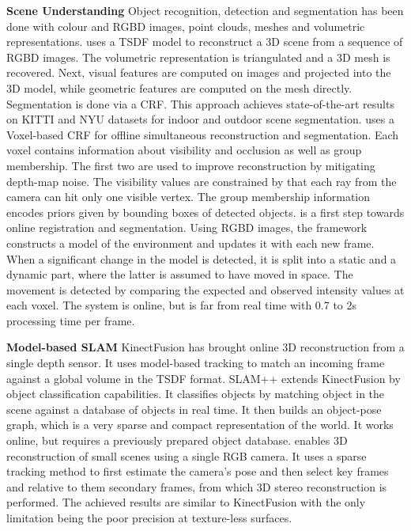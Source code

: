 \documentclass{llncs}
\begin{document}
  \textbf{Scene Understanding } Object recognition, detection and segmentation has been done with colour and RGBD images, point clouds, meshes and volumetric representations. \cite{mesh}  uses a TSDF model to reconstruct a 3D scene from a sequence of RGBD images. The volumetric representation is triangulated and a 3D mesh is recovered. Next, visual features are computed on images and projected into the 3D model, while geometric features are computed on the mesh directly. Segmentation is done via a CRF. This approach achieves state-of-the-art results on KITTI and NYU datasets for indoor and outdoor scene segmentation. \cite{VCRF} uses a Voxel-based CRF for offline simultaneous reconstruction and segmentation. Each voxel contains information about visibility and occlusion as well as group membership. The first two are used to improve reconstruction by mitigating depth-map noise. The visibility values are constrained by that each ray from the camera can hit only one visible vertex. The group membership information encodes priors given by bounding boxes of detected objects. \cite{ChangeDetection} is a first step towards online registration and segmentation. Using RGBD images, the framework constructs a model of the environment and updates it with each new frame. When a significant change in the model is detected, it is split into a static and a dynamic part, where the latter is assumed to have moved in space. The movement is detected by comparing the expected and observed intensity values at each voxel. The system is online, but is far from real time with 0.7 to 2s processing time per frame. 

  \noindent
  \textbf{Model-based SLAM } KinectFusion \cite{fusion} has brought online 3D reconstruction from a single depth sensor. It uses model-based tracking to match an incoming frame against a global volume in the TSDF \cite{TSDF} format. SLAM++ extends KinectFusion by object classification capabilities. It classifies objects by matching object in the scene against a database of objects in real time. It then builds an object-pose graph, which is a very sparse and compact representation of the world. It works online, but requires a previously prepared object database. \cite{monofusion} enables 3D reconstruction of small scenes using a single RGB camera. It uses a sparse tracking method to first estimate the camera's pose and then select key frames and relative to them secondary frames, from which 3D stereo reconstruction is performed. The achieved results are similar to KinectFusion with the only limitation being the poor precision at texture-less surfaces. 
    
\end{document}
